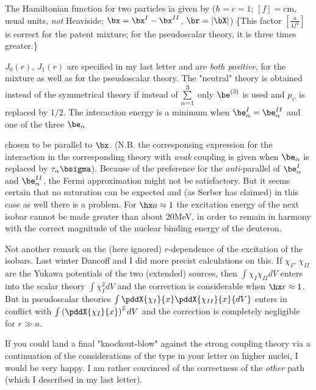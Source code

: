 The Hamiltonian function for two particles ia given by ($\hbar=c=1$; $[f]=\text{cm}$, usual units, \textit{not} Heaviside; $\bx = \bx^I - \bx^{II}$, $\br = |\bX|$)
\{This factor $\left[\frac{a}{4f^2}\right]$ is correct for the patent mixture; for the pseudoscalar theory, it is three times greater.\}

$J_0(r)$, $J_1(r)$ are specified in my last letter and are \textit{both positive}, for the mixture as well as for the pseudoscalar theory. The "neutral" theory is obtained instead of the symmetrical theory if instead of $\underset{\alpha=1}{\overset{3}{\sum}}$ only $\be^{(3)}$ is used and $p_\psi$ is replaced by $1/2$. The interaction energy is a minimum when $\be_\alpha^I = \be_\alpha^{II}$ and one of the three $\be_\alpha$ 


chosen to be parallel to $\bx$. (N.B. the corresponsing expression for the interaction in the corresponding theory with \textit{weak} coupling is given when $\be_\alpha$ is replaced by $\tau_\alpha \bsigma$). Because of the preference for the \textit{anti}-parallel  of $\be_\alpha^I$ and $\be_\alpha^{II}$, the Fermi approximation might not be satisfactory. But it seems certain that no saturation can be expected and (as Serber has claimed) in this case as well there is a problem. For $\hx a \approx 1$ the excitation energy of the next isobar cannot be made greater than about 20MeV, in order to remain in harmony with the correct magnitude of the nuclear binding energy of the deuteron.

Not another remark on the (here ignored) $r$-dependence of the excitation of the isobars. Last winter Dancoff and I did more precist calculations on this. If $\chi_I$, $\chi_{II}$ are the Yukawa potentials of the two (extended) sources, then $\int\chi_I\chi_{II}{dV}$ enters into the scalar theory  $\int\chi_I^2{dV}$ and the correction is considerable when $\hx r \approx 1$. But in pseudoscalar theories $\int\pddX{\chi_I}{x}\pddX{\chi_{II}}{x}{dV}$ enters in conflict with $\int\left(\pddX{\chi_I}{x}\right)^2{dV}$ and the correction is completely negligible for $r\gg a$.

If you could land a final "knockout-blow" against the strong coupling theory via a continuation of the considerations of the type in your letter on higher nuclei, I would be very happy. I am rather convinced of the correctness of the \textit{other} path (which I described in my last letter).

